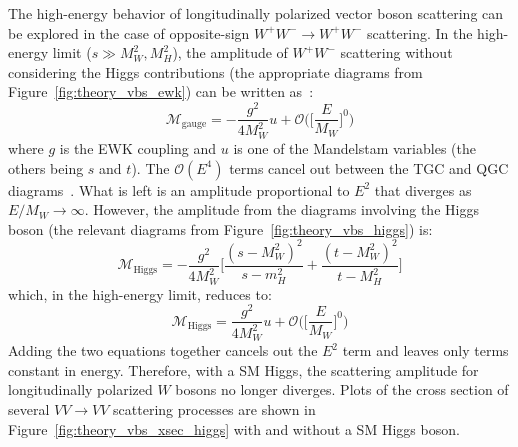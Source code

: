 The high-energy behavior of longitudinally polarized vector boson scattering can be explored in the case of opposite-sign $W^{+}W^{-}\rightarrow W^{+}W^{-}$ scattering.
In the high-energy limit ($s \gg M_W^2, M_H^2$), the amplitude of $W^{+}W^{-}$ scattering without considering the Higgs contributions (the appropriate diagrams from Figure~\ref{fig:theory_vbs_ewk}) can be written as~\cite{2009.strong-gauge-boson-scattering}:
\begin{equation}
  \mathcal{M}_{\textrm{gauge}} = -\frac{g^2}{4M_W^2}u+\mathcal{O}\Bigg(\bigg[\frac{E}{M_W}\bigg]^0\Bigg)
  \label{eq:theory_longitudinal_m_gauge}
\end{equation}
where $g$ is the EWK coupling and $u$ is one of the Mandelstam variables (the others being $s$ and $t$).
The $\mathcal{O}(E^4)$ terms cancel out between the TGC and QGC diagrams~\cite{2012.vbs-thesis-oord}.
What is left is an amplitude proportional to $E^2$ that diverges as $E/M_W\rightarrow\infty$.
However, the amplitude from the diagrams involving the Higgs boson (the relevant diagrams from Figure~\ref{fig:theory_vbs_higgs}) is:
\begin{equation}
  \mathcal{M}_{\textrm{Higgs}} = -\frac{g^2}{4M_W^2}\bigg[\frac{(s-M_W^2)^2}{s-m_H^2}+\frac{(t-M_W^2)^2}{t-M_H^2}\bigg]
\end{equation}
which, in the high-energy limit, reduces to:
\begin{equation}
  \mathcal{M}_{\textrm{Higgs}} = \frac{g^2}{4M_W^2}u+\mathcal{O}\Bigg(\bigg[\frac{E}{M_W}\bigg]^0\Bigg)
  \label{eq:theory_longitudinal_m_higgs}
\end{equation}
Adding the two equations together cancels out the $E^2$ term and leaves only terms constant in energy.
Therefore, with a SM Higgs, the scattering amplitude for longitudinally polarized $W$ bosons no longer diverges.
Plots of the cross section of several $VV\rightarrow VV$ scattering processes are shown in Figure~\ref{fig:theory_vbs_xsec_higgs} with and without a SM Higgs boson.

